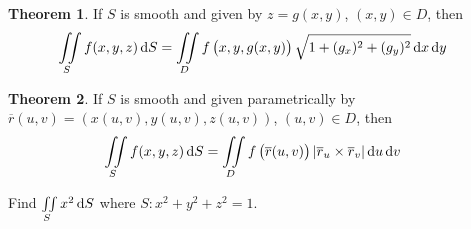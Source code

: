 \documentclass[fleqn, a4paper, 8pt, twoside]{amsart}
\theoremstyle{definition}
\theoremstyle{bluedefinition}
\theoremstyle{redtheorem}
\newtheorem{theorem}{Theorem}
\begin{document}
\begin{multicols}{2}
\begin{spacing}{0.7}
\begin{theorem}
	If $S$ is smooth and given by $z = g(x,y)$, $(x,y) \in D$, then
	\begin{align*}
		\iint\limits_{S} f(x,y,z) \dif S &= \iint\limits_{D} f\left( x , y , g(x,y) \right) \sqrt{1 + (g_x)^2 + (g_y)^2} \dif x \dif y
	\end{align*}
\end{theorem}
\begin{theorem}
	If $S$ is smooth and given parametrically by $\overline{r}(u,v) = \left( x(u,v) , y(u,v) , z(u,v) \right)$, $(u,v) \in D$, then
	\begin{align*}
		\iint\limits_{S} f(x,y,z) \dif S &= \iint\limits_{D} f\left( \overline{r}(u,v) \right) \left| \overline{r}_u \times \overline{r}_v \right| \dif u \dif v
	\end{align*}
\end{theorem}

\begin{question}
	Find $\iint\limits_{S} x^2 \dif S$ where $S : x^2 + y^2 + z^2 = 1$.
\end{question}


\end{spacing}
\end{multicols}
\end{document}
